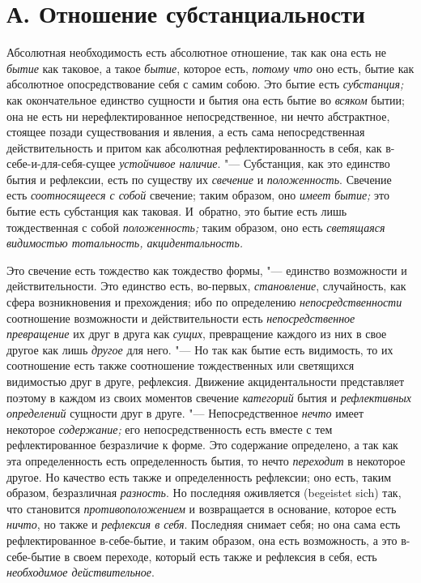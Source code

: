 \section[А. Отношение субстанциальности]{А. Отношение субстанциальности}

Абсолютная необходимость есть абсолютное
отношение, так как она есть не {\em бытие} как таковое,
а такое {\em бытие}, которое есть,
{\em потому что} оно есть, бытие как абсолютное
опосредствование себя с самим собою. Это бытие есть
{\em субстанция;} как окончательное единство сущности и
бытия она есть бытие во {\em всяком} бытии; она не есть
ни нерефлектированное непосредственное, ни нечто абстрактное, стоящее
позади существования и явления, а есть сама непосредственная
действительность и притом как абсолютная рефлектированность в себя, как
в-себе-и-для-себя-сущее {\em устойчивое наличие}. "---
Субстанция, как это единство бытия и рефлексии, есть по существу их
{\em свечение} и {\em положенность}. Свечение есть
{\em соотносящееся с собой} свечение; таким образом,
оно {\em имеет бытие;} это бытие есть субстанция как
таковая. И~обратно, это бытие есть лишь тождественная с собой
{\em положенность;} таким образом, оно есть
{\em светящаяся видимостью тотальность, акцидентальность.}

Это свечение есть тождество как тождество формы, "--- единство возможности и
действительности. Это единство есть, во-первых,
{\em становление}, случайность, как сфера возникновения
и прехождения; ибо по определению
{\em непосредственности} соотношение возможности и
действительности есть {\em непосредственное
превращение} их друг в друга как {\em сущих},
превращение каждого из них в свое другое как лишь
{\em другое} для него. "--- Но так как бытие есть
видимость, то их соотношение есть также соотношение тождественных или
светящихся видимостью друг в друге, рефлексия. Движение акцидентальности
представляет поэтому в каждом из своих моментов свечение {\em категорий}
бытия и {\em рефлективных определений} сущности друг в друге. "---
Непосредственное {\em нечто} имеет некоторое
{\em содержание;} его непосредственность есть вместе с
тем рефлектированное безразличие к форме. Это содержание определено, а так
как эта определенность есть определенность бытия, то нечто
{\em переходит} в некоторое другое. Но качество есть
также и определенность рефлексии; оно есть, таким образом, безразличная
{\em разность}. Но последняя оживляется (begeistet sich)
так, что становится {\em противоположением} и
возвращается в основание, которое есть {\em ничто}, но
также и {\em рефлексия в себя}. Последняя снимает себя;
но она сама есть рефлектированное в-себе-бытие, и таким образом, она есть
возможность, а это в-себе-бытие в своем переходе, который есть также и
рефлексия в себя, есть {\em необходимое действительное}.

